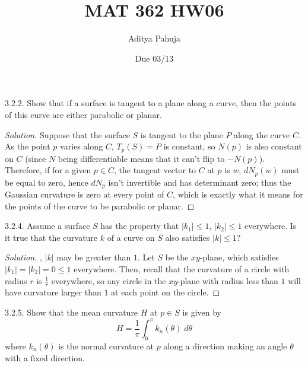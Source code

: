 \documentclass[10pt]{scrartcl}
\title{\vspace{-2em}MAT 362 HW06}
\author{\large Aditya Pahuja}
\date{\large Due 03/13}
\providecommand{\dif}{\;d}
\newenvironment{soln}{\begin{proof}[Solution]}{\end{proof}}
\begin{document}
\maketitle

\begin{problem*}3.2.2.
	Show that if a surface is tangent to a plane along a curve,
	then the points of this curve are either parabolic or planar.
\end{problem*}

\begin{soln}
	Suppose that the surface $S$ is tangent to the plane $P$
	along the curve $C$. As the point $p$ varies along $C$,
	$T_p(S) = P$ is constant, so $N(p)$ is also constant on $C$
	(since $N$ being differentiable means that it can't flip to $-N(p)$).
	Therefore, if for a given $p\in C$, the tangent vector to $C$ at $p$ is $w$,
	$dN_p(w)$ must be equal to zero, hence $dN_p$ isn't invertible
	and has determinant zero; thus the Gaussian curvature is zero
	at every point of $C$, which is exactly what it means
	for the points of the curve to be parabolic or planar.
\end{soln}

\begin{problem*}3.2.4.
	Assume a surface $S$ has the property that $|k_1|\le 1$, $|k_2|\le 1$
	everywhere. Is it true that the curvature $k$ of a curve on $S$
	also satisfies $|k|\le 1$?
\end{problem*}

\begin{soln}
	, $|k|$ may be greater than $1$.
	Let $S$ be the $xy$-plane, which satisfies $|k_1|=|k_2|=0\le 1$ everywhere.
	Then, recall that the curvature of a circle with radius $r$
	is $\frac1r$ everywhere, so any circle in the $xy$-plane
	with radius less than $1$ will have curvature larger than $1$
	at each point on the circle. 
\end{soln}

\begin{problem*}3.2.5.
	Show that the mean curvature $H$ at $p\in S$ is given by
	\[H = \frac1\pi\int_0^\pi k_n(\theta)\dif\theta\]
	where $k_n(\theta)$ is the normal curvature at $p$
	along a direction making an angle $\theta$ with a fixed direction.
\end{problem*}
\end{document}
